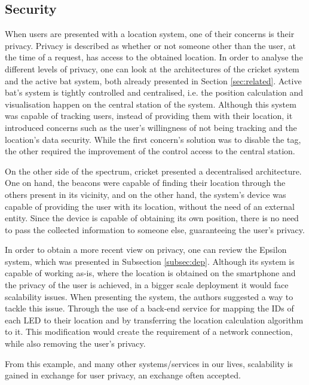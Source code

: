  
 
 
\subsection{Security} 
\label{subsec:sec} 
 
 
When users are presented with a location system, one of their concerns is their privacy. Privacy is described as whether or not someone other than the user, at the time of a request, has access to the obtained location. In order to analyse the different levels of privacy, one can look at the architectures of the cricket system and the active bat system, both already presented in Section \ref{sec:related}. Active bat's system is tightly controlled and centralised, i.e. the position calculation and visualisation happen on the central station of the system. Although this system was capable of tracking users, instead of providing them with their location, it introduced concerns such as the user's willingness of not being tracking and the location's data security. While the first concern's solution was to disable the tag, the other required the improvement of the control access to the central station. 
 
 
On the other side of the spectrum, cricket presented a decentralised architecture. One on hand, the beacons were capable of finding their location through the others present in its vicinity, and on the other hand, the system's device was capable of providing the user with its location, without the need of an external entity. Since the device is capable of obtaining its own position, there is no need to pass the collected information to someone else, guaranteeing the user's privacy.  
 
 
In order to obtain a more recent view on privacy, one can review the Epsilon system, which was presented in Subsection \ref{subsec:dep}. Although its system is capable of working as-is, where the location is obtained on the smartphone and the privacy of the user is achieved, in a bigger scale deployment it would face scalability issues. When presenting the system, the authors suggested a way to tackle this issue. Through the use of a back-end service for mapping the IDs of each LED to their location and by transferring the location calculation algorithm to it. This modification would create the requirement of a network connection, while also removing the user's privacy.  
 
 
From this example, and many other systems/services in our lives, scalability is gained in exchange for user privacy, an exchange often accepted. 